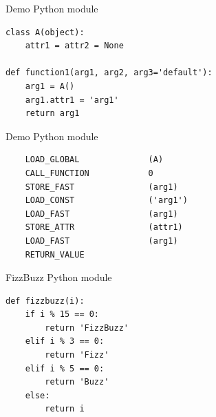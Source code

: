 \documentclass{icldt}
\numberwithin{equation}{section}       %
\begin{document}
\begin{listing}[H]
	\caption{Demo Python module}
	\begin{verbatim}
class A(object):
    attr1 = attr2 = None

def function1(arg1, arg2, arg3='default'):
    arg1 = A()
    arg1.attr1 = 'arg1'
    return arg1
	\end{verbatim}
	\label{lst:py-demo}
\end{listing}

\begin{listing}[H]
	\caption{Demo Python module}
	\begin{verbatim}
	LOAD_GLOBAL              (A)
	CALL_FUNCTION            0
	STORE_FAST               (arg1)
	LOAD_CONST               ('arg1')
	LOAD_FAST                (arg1)
	STORE_ATTR               (attr1)
	LOAD_FAST                (arg1)
	RETURN_VALUE
	\end{verbatim}
	\label{lst:py-demo}
\end{listing}
             
\begin{listing}[H]
	\caption{FizzBuzz Python module}
	\begin{verbatim}
def fizzbuzz(i):
    if i % 15 == 0:
        return 'FizzBuzz'
    elif i % 3 == 0:
        return 'Fizz'
    elif i % 5 == 0:
        return 'Buzz'
    else:
        return i
	\end{verbatim}
	\label{lst:py-fizzbuzz}
\end{listing}
\end{document}
